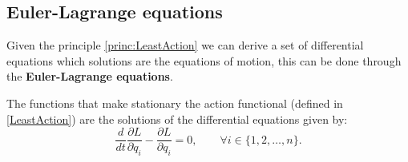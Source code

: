 \subsection{Euler-Lagrange equations}
Given the principle \ref{princ:LeastAction} we can derive a set of differential equations which solutions are the equations of motion, this can be done through the \textbf{Euler-Lagrange equations}.
\begin{theorem}
    The functions that make stationary the action functional (defined in \eqref{LeastAction}) are the solutions of the differential equations given by:
    \begin{equation}\label{Euler-Lagrange}
        \frac{d}{dt}\frac{\partial L}{\partial \dot q_i}-\frac{\partial L}{\partial q_i}=0,\qquad \forall i\in\{1,2,\dots,n\}.
    \end{equation}
\end{theorem}
